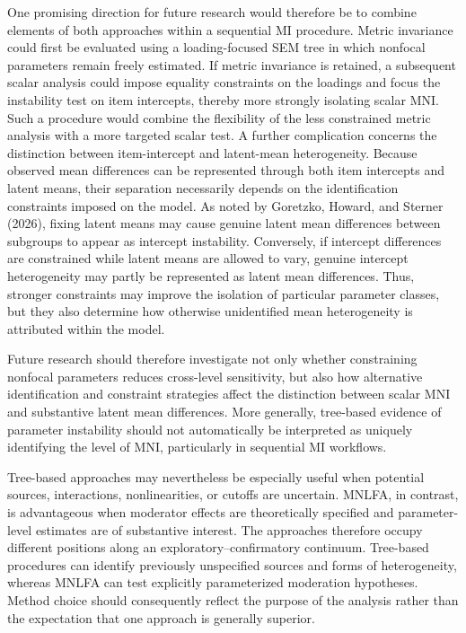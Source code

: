 \documentclass[
  man,
  floatsintext]{apa7}
\begin{document}
One promising direction for future research would therefore be to
combine elements of both approaches within a sequential MI procedure.
Metric invariance could first be evaluated using a loading-focused SEM
tree in which nonfocal parameters remain freely estimated. If metric
invariance is retained, a subsequent scalar analysis could impose
equality constraints on the loadings and focus the instability test on
item intercepts, thereby more strongly isolating scalar MNI. Such a
procedure would combine the flexibility of the less constrained metric
analysis with a more targeted scalar test. A further complication
concerns the distinction between item-intercept and latent-mean
heterogeneity. Because observed mean differences can be represented
through both item intercepts and latent means, their separation
necessarily depends on the identification constraints imposed on the
model. As noted by Goretzko, Howard, and Sterner (2026), fixing latent
means may cause genuine latent mean differences between subgroups to
appear as intercept instability. Conversely, if intercept differences
are constrained while latent means are allowed to vary, genuine
intercept heterogeneity may partly be represented as latent mean
differences. Thus, stronger constraints may improve the isolation of
particular parameter classes, but they also determine how otherwise
unidentified mean heterogeneity is attributed within the model.

Future research should therefore investigate not only whether
constraining nonfocal parameters reduces cross-level sensitivity, but
also how alternative identification and constraint strategies affect the
distinction between scalar MNI and substantive latent mean differences.
More generally, tree-based evidence of parameter instability should not
automatically be interpreted as uniquely identifying the level of MNI,
particularly in sequential MI workflows.

Tree-based approaches may nevertheless be especially useful when
potential sources, interactions, nonlinearities, or cutoffs are
uncertain. MNLFA, in contrast, is advantageous when moderator effects
are theoretically specified and parameter-level estimates are of
substantive interest. The approaches therefore occupy different
positions along an exploratory--confirmatory continuum. Tree-based
procedures can identify previously unspecified sources and forms of
heterogeneity, whereas MNLFA can test explicitly parameterized
moderation hypotheses. Method choice should consequently reflect the
purpose of the analysis rather than the expectation that one approach is
generally superior.
\end{document}
